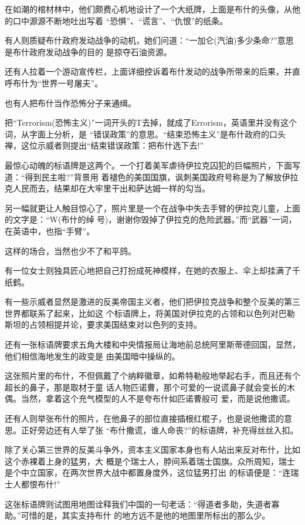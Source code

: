 ﻿\documentclass[11pt]{article}
\begin{document}
在如潮的棺材林中，他们颇费心机地设计了一个大纸牌，上面是布什的头像，从他的口中源源不断地吐出写着
``恐惧''、``谎言''、``仇恨''的纸条。

有人则质疑布什政府发动战争的动机，她们问道：``一加仑(汽油)多少条命?''意思是布什政府发动战争的目的
是掠夺石油资源。


还有人拉着一个游动宣传栏，上面详细控诉着布什发动的战争所带来的后果，并直呼布什为``世界一号屠夫''。

也有人把布什当作恐怖分子来通缉。

把``Terrorism(恐怖主义)''一词开头的T去掉，就成了Errorism，英语里并没有这个词，从字面上分析，是
``错误政策''的意思。``结束恐怖主义''是布什政府的口头禅，这位示威者则提出``结束错误政策：把布什选下去!''

最惊心动魄的标语牌是这两个。一个打着美军虐待伊拉克囚犯的巨幅照片，下面写道：``得到民主啦?''背景用
着褪色的美国国旗，讽刺美国政府号称是为了解放伊拉克人民而去，结果却在大牢里干出和萨达姆一样的勾当。

另一幅就更让人触目惊心了，照片里是一个在战争中失去手臂的伊拉克儿童，上面的文字是：``W(布什的绰
号)，谢谢你毁掉了伊拉克的危险武器。''而``武器''一词，在英语中，也指``手臂''。

这样的场合，当然也少不了和平鸽。

有一位女士则独具匠心地把自己打扮成死神模样，在她的衣服上、伞上却挂满了千纸鹤。

有一些示威者显然是激进的反美帝国主义者，他们把伊拉克战争和整个反美的第三世界都联系了起来，比如这
个标语牌上，将美国对伊拉克的占领和以色列对巴勒斯坦的占领相提并论，要求美国结束对以色列的支持。

还有一张标语牌要求五角大楼和中央情报局让海地前总统阿里斯蒂德回国，显然，他们相信海地发生的政变是
由美国暗中操纵的。

这张照片里的布什，不但佩戴了个纳粹徽章，如希特勒般地举起右手，而且还有个超长的鼻子，那是取材于童
话人物匹诺曹，那个可爱的一说谎鼻子就会变长的木偶。当然，拿着这个充气模型的人不是夸布什如匹诺曹般可
爱，而是说他撒谎。

还有人则举张布什的照片，在他鼻子的部位直接插根红棍子，也是说他撒谎的意思。正好旁边还有人举了张
``布什撒谎，谁人命丧?''的标语牌，补充得丝丝入扣。

除了关心第三世界的反美斗争外，资本主义国家本身也有人站出来反对布什，比如这个赤裸着上身的猛男，大
概是个瑞士人，脖间系着瑞士国旗。众所周知，瑞士是个中立国家，在两次世界大战中都置身度外，这位猛男打出
的标语便是：``连瑞士人都恨布什!''

这张标语牌则试图用地图诠释我们中国的一句老话：``得道者多助，失道者寡助。''可惜的是，其实支持布什
的地方远不是他的地图里所标出的那么少。
\end{document}
